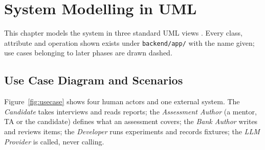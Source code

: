 \documentclass{tietreport}
\begin{document}
\chapter{System Modelling in UML}
\label{ch:uml}

This chapter models the system in three standard UML views \cite{booch2005uml}. Every class,
attribute and operation shown exists under \texttt{backend/app/} with the name given; use cases
belonging to later phases are drawn dashed.

\section{Use Case Diagram and Scenarios}

Figure~\ref{fig:usecase} shows four human actors and one external system. The
\emph{Candidate} takes interviews and reads reports; the \emph{Assessment Author} (a mentor, TA or
the candidate) defines what an assessment covers; the \emph{Bank Author} writes and reviews
items; the \emph{Developer} runs experiments and records fixtures; the \emph{LLM Provider} is
called, never calling.
\end{document}
